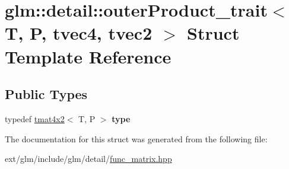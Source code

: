 \hypertarget{structglm_1_1detail_1_1outer_product__trait_3_01_t_00_01_p_00_01tvec4_00_01tvec2_01_4}{\section{glm\-:\-:detail\-:\-:outer\-Product\-\_\-trait$<$ T, P, tvec4, tvec2 $>$ Struct Template Reference}
\label{structglm_1_1detail_1_1outer_product__trait_3_01_t_00_01_p_00_01tvec4_00_01tvec2_01_4}
}
\subsection*{Public Types}
\begin{DoxyCompactItemize}
\item 
\hypertarget{structglm_1_1detail_1_1outer_product__trait_3_01_t_00_01_p_00_01tvec4_00_01tvec2_01_4_a15cc3a28bd3e09c75a19ce0349c76d9a}{typedef \hyperlink{structglm_1_1tmat4x2}{tmat4x2}$<$ T, P $>$ {\bfseries type}}\label{structglm_1_1detail_1_1outer_product__trait_3_01_t_00_01_p_00_01tvec4_00_01tvec2_01_4_a15cc3a28bd3e09c75a19ce0349c76d9a}

\end{DoxyCompactItemize}


The documentation for this struct was generated from the following file\-:\begin{DoxyCompactItemize}
\item 
ext/glm/include/glm/detail/\hyperlink{func__matrix_8hpp}{func\-\_\-matrix.\-hpp}\end{DoxyCompactItemize}
